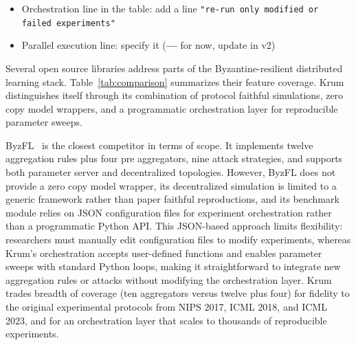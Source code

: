 \documentclass[twoside,11pt]{article}
\begin{document}
{\begin{itemize}
\begin{itemize}
        \item 10 aggregators vs 36 (FL-Byz-Lib) and 12+4 pre (ByzFL)
        \item No pre-aggregators (nearest neighbor filtering, bucketing, clipping)
        \item Synchronous and sequential execution, no multiprocessing or distributed backends (UPDATE v2 once parallel execution is added)
        \item Reframe: these are planned future work, not design oversights
        \begin{itemize}
            \item The 10 aggregators cover the most widely used rules in the literature (Krum, Multi Krum, Bulyan, Trimmed Mean, Median and variants)
            \item The 3 simulation protocols reproduce the foundational experiments of the field
        \end{itemize}
    \end{itemize}
    \item Orchestration line in the table: add a line \texttt{"re-run only modified or failed experiments"}
    \item Parallel execution line: specify it (\textbf{---} for now, update in v2) 
\end{itemize}
}

Several open source libraries address parts of the Byzantine-resilient distributed learning stack. Table~\ref{tab:comparison} summarizes their feature coverage. Krum distinguishes itself through its combination of protocol faithful simulations, zero copy model wrappers, and a programmatic orchestration layer for reproducible parameter sweeps.

ByzFL~\citep{byzfl} is the closest competitor in terms of scope. It implements twelve aggregation rules plus four pre aggregators, nine attack strategies, and supports both parameter server and decentralized topologies. However, ByzFL does not provide a zero copy model wrapper, its decentralized simulation is limited to a generic framework rather than paper faithful reproductions, and its benchmark module relies on JSON configuration files for experiment orchestration rather than a programmatic Python API. This JSON-based approach limits flexibility: researchers must manually edit configuration files to modify experiments, whereas Krum's orchestration accepts user-defined functions and enables parameter sweeps with standard Python loops, making it straightforward to integrate new aggregation rules or attacks without modifying the orchestration layer. Krum trades breadth of coverage (ten aggregators versus twelve plus four) for fidelity to the original experimental protocols from NIPS 2017, ICML 2018, and ICML 2023, and for an orchestration layer that scales to thousands of reproducible experiments.
\end{document}
